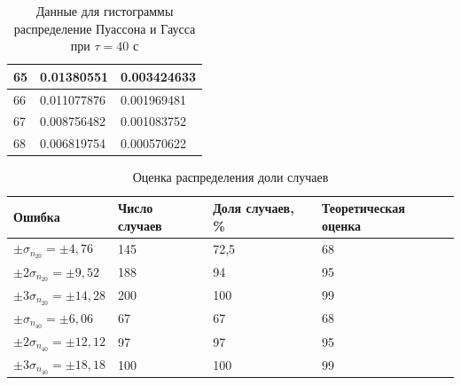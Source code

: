 \documentclass[a4paper]{article}
\begin{document}
\begin{table}[!h]
\begin{center}
\begin{tabular}{|l|l|l|}
65                       & 0.01380551                                            & 0.003424633                                       \\ \hline
66                       & 0.011077876                                           & 0.001969481                                       \\ \hline
67                       & 0.008756482                                           & 0.001083752                                       \\ \hline
68                       & 0.006819754                                           & 0.000570622                                       \\ \hline
\end{tabular}
\caption{Данные для гистограммы распределение Пуассона и Гаусса при $\tau = 40$ с}
\end{center}
\end{table}

\begin{table}[!h]
\begin{center}
\begin{tabular}{|l|l|l|l|}
\hline
Ошибка                             & Число случаев & Доля случаев, \% & Теоретическая оценка \\ \hline
$\pm\sigma_{n_{20}} = \pm 4,76$    & 145           & 72,5             & 68                   \\ \hline
$\pm 2\sigma_{n_{20}} = \pm 9,52$  & 188           & 94               & 95                   \\ \hline
$\pm 3\sigma_{n_{20}} = \pm 14,28$ & 200           & 100              & 99                   \\ \hline
$\pm\sigma_{n_{40}} = \pm 6,06$    & 67            & 67               & 68                   \\ \hline
$\pm 2\sigma_{n_{40}} = \pm 12,12$ & 97            & 97               & 95                   \\ \hline
$\pm 3\sigma_{n_{40}} = \pm 18,18$ & 100           & 100              & 99                   \\ \hline
\end{tabular}
\caption{Оценка распределения доли случаев}
\end{center}
\end{table}
\end{document}
